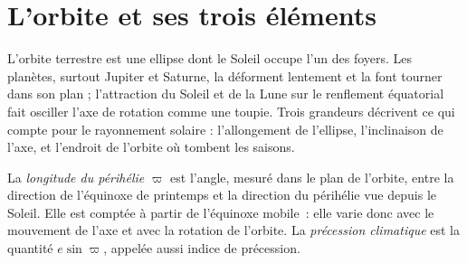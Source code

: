 \section{L'orbite et ses trois éléments}\label{sec:b2:orbital-forcing:elements}

L'orbite terrestre est une ellipse dont le Soleil occupe l'un des foyers. Les planètes, surtout Jupiter et Saturne,
la déforment lentement et la font tourner dans son plan ; l'attraction du Soleil et de la Lune sur le
renflement équatorial fait osciller l'axe de rotation comme une toupie. Trois grandeurs décrivent ce qui
compte pour le rayonnement solaire : l'allongement de l'ellipse, l'inclinaison de l'axe, et l'endroit de
l'orbite où tombent les saisons.

\begin{definition}\label{def:b2:orbital-forcing:elements}
La \emph{longitude du périhélie} $\varpi$ est l'angle, mesuré dans le plan de l'orbite,
entre la direction de l'équinoxe de printemps et la direction du périhélie vue depuis le Soleil. Elle est comptée
à partir de l'équinoxe mobile~: elle varie donc avec le mouvement de l'axe et avec la rotation de
l'orbite. La \emph{précession
climatique} est la quantité $e\sin\varpi$, appelée aussi indice de
précession.
\end{definition}

